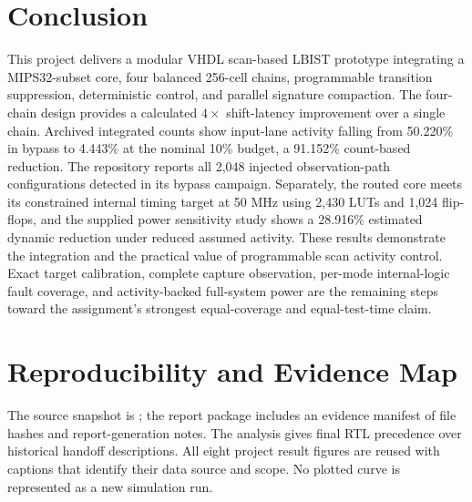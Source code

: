 \documentclass[conference,a4paper]{IEEEtran}
\newcommand{\rtl}[1]{\texttt{\detokenize{#1}}}
\begin{document}
\section{Conclusion}
This project delivers a modular VHDL scan-based LBIST prototype integrating
a MIPS32-subset core, four balanced 256-cell chains, programmable transition
suppression, deterministic control, and parallel signature compaction. The
four-chain design provides a calculated $4\times$ shift-latency improvement
over a single chain. Archived integrated counts show input-lane activity
falling from 50.220\% in bypass to 4.443\% at the nominal 10\% budget, a
91.152\% count-based reduction. The repository reports all 2,048 injected
observation-path configurations detected in its bypass campaign. Separately,
the routed core meets its constrained internal timing target at 50 MHz using
2,430 LUTs and 1,024 flip-flops, and the supplied power sensitivity study shows
a 28.916\% estimated dynamic reduction under reduced assumed activity.
These results demonstrate the integration and the practical value of
programmable scan activity control. Exact target calibration, complete capture
observation, per-mode internal-logic fault coverage, and activity-backed
full-system power are the remaining steps toward the assignment's strongest
equal-coverage and equal-test-time claim.

\balance
\appendices
\section{Reproducibility and Evidence Map}
The source snapshot is \rtl{bc81786}; the report package includes an evidence
manifest of file hashes and report-generation notes. The analysis gives final
RTL precedence over historical handoff descriptions. All eight project result
figures are reused with captions that identify their data source and scope.
No plotted curve is represented as a new simulation run.
\end{document}
